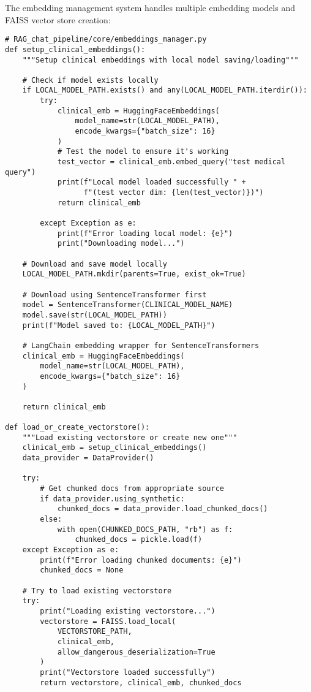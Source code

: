 The embedding management system handles multiple embedding models and FAISS vector store creation:

\begin{verbatim}
# RAG_chat_pipeline/core/embeddings_manager.py
def setup_clinical_embeddings():
    """Setup clinical embeddings with local model saving/loading"""
    
    # Check if model exists locally
    if LOCAL_MODEL_PATH.exists() and any(LOCAL_MODEL_PATH.iterdir()):
        try:
            clinical_emb = HuggingFaceEmbeddings(
                model_name=str(LOCAL_MODEL_PATH),
                encode_kwargs={"batch_size": 16}
            )
            # Test the model to ensure it's working
            test_vector = clinical_emb.embed_query("test medical query")
            print(f"Local model loaded successfully " +
                  f"(test vector dim: {len(test_vector)})")
            return clinical_emb
        
        except Exception as e:
            print(f"Error loading local model: {e}")
            print("Downloading model...")
    
    # Download and save model locally
    LOCAL_MODEL_PATH.mkdir(parents=True, exist_ok=True)
    
    # Download using SentenceTransformer first
    model = SentenceTransformer(CLINICAL_MODEL_NAME)
    model.save(str(LOCAL_MODEL_PATH))
    print(f"Model saved to: {LOCAL_MODEL_PATH}")
    
    # LangChain embedding wrapper for SentenceTransformers
    clinical_emb = HuggingFaceEmbeddings(
        model_name=str(LOCAL_MODEL_PATH),
        encode_kwargs={"batch_size": 16}
    )
    
    return clinical_emb

def load_or_create_vectorstore():
    """Load existing vectorstore or create new one"""
    clinical_emb = setup_clinical_embeddings()
    data_provider = DataProvider()
    
    try:
        # Get chunked docs from appropriate source
        if data_provider.using_synthetic:
            chunked_docs = data_provider.load_chunked_docs()
        else:
            with open(CHUNKED_DOCS_PATH, "rb") as f:
                chunked_docs = pickle.load(f)
    except Exception as e:
        print(f"Error loading chunked documents: {e}")
        chunked_docs = None
    
    # Try to load existing vectorstore
    try:
        print("Loading existing vectorstore...")
        vectorstore = FAISS.load_local(
            VECTORSTORE_PATH,
            clinical_emb,
            allow_dangerous_deserialization=True
        )
        print("Vectorstore loaded successfully")
        return vectorstore, clinical_emb, chunked_docs
    

\end{verbatim}
